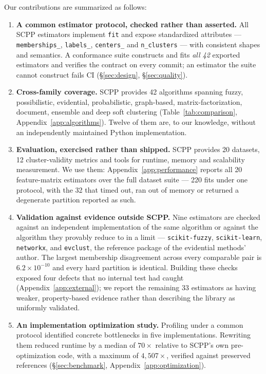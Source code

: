 \documentclass[twoside,11pt]{article}
\begin{document}
Our contributions are summarized as follows:

\begin{enumerate}[leftmargin=*,topsep=2pt,itemsep=1pt]

\item \textbf{A common estimator protocol, checked rather than asserted.}
All SCPP estimators implement \texttt{fit} and expose standardized attributes
--- \texttt{memberships\_}, \texttt{labels\_}, \texttt{centers\_} and
\texttt{n\_clusters} --- with consistent shapes and semantics. A conformance
suite constructs and fits \emph{all 42} exported estimators and verifies the
contract on every commit; an estimator the suite cannot construct fails CI
(\S\ref{sec:design}, \S\ref{sec:quality}).

\item \textbf{Cross-family coverage.}
SCPP provides 42 algorithms spanning fuzzy, possibilistic, evidential,
probabilistic, graph-based, matrix-factorization, document, ensemble and deep
soft clustering (Table~\ref{tab:comparison}, Appendix~\ref{app:algorithms}).
Twelve of them are, to our knowledge, without an independently maintained
Python implementation.

\item \textbf{Evaluation, exercised rather than shipped.}
SCPP provides 20 datasets, 12 cluster-validity metrics and tools for runtime,
memory and scalability measurement. We use them: Appendix~\ref{app:performance}
reports all 20 feature-matrix estimators over the full dataset suite --- 220
fits under one protocol, with the 32 that timed out, ran out of memory or
returned a degenerate partition reported as such.

\item \textbf{Validation against evidence outside SCPP.}
Nine estimators are checked against an independent implementation of the same
algorithm or against the algorithm they provably reduce to in a limit ---
\texttt{scikit-fuzzy}, \texttt{scikit-learn}, \texttt{networkx}, and
\texttt{evclust}, the reference package of the evidential methods' author.
The largest membership disagreement across every comparable pair is
$6.2\times10^{-10}$ and every hard partition is identical. Building these
checks exposed four defects that no internal test had caught
(Appendix~\ref{app:external}); we report the remaining 33 estimators as
having weaker, property-based evidence rather than describing the library as
uniformly validated.

\item \textbf{An implementation optimization study.}
Profiling under a common protocol identified concrete bottlenecks in five
implementations. Rewriting them reduced runtime by a median of $70\times$
relative to SCPP's own pre-optimization code, with a maximum of
$4{,}507\times$, verified against preserved references
(\S\ref{sec:benchmark}, Appendix~\ref{app:optimization}).


\end{enumerate}
\end{document}
